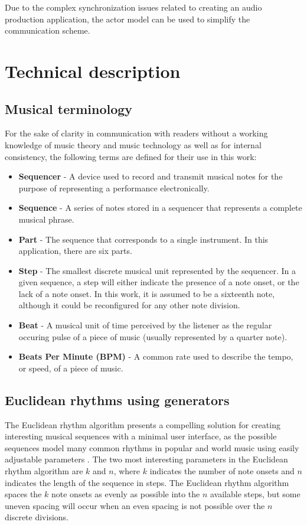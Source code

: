 \documentclass{sig-alternate-05-2015}
\begin{document}
Due to the complex synchronization issues related to creating an audio production application, the actor model can be used to simplify the communication scheme. 

\section{Technical description}

\subsection{Musical terminology}
For the sake of clarity in communication with readers without a working knowledge of music theory and music technology as well as for internal consistency, the following terms are defined for their use in this work:

\begin{itemize}
\item \textbf{Sequencer} - A device used to record and transmit musical notes for the purpose of representing a performance electronically.
\item \textbf{Sequence} - A series of notes stored in a sequencer that represents a complete musical phrase. 
\item \textbf{Part} - The sequence that corresponds to a single instrument. In this application, there are six parts.
\item \textbf{Step} - The smallest discrete musical unit represented by the sequencer. In a given sequence, a step will either indicate the presence of a note onset, or the lack of a note onset. In this work, it is assumed to be a sixteenth note, although it could be reconfigured for any other note division. 
\item \textbf{Beat} - A musical unit of time perceived by the listener as the regular occuring pulse of a piece of music (usually represented by a quarter note).
\item \textbf{Beats Per Minute (BPM)} - A common rate used to describe the tempo, or speed, of a piece of music.
\end{itemize}

\subsection{Euclidean rhythms using generators}
The Euclidean rhythm algorithm presents a compelling solution for creating interesting musical sequences with a minimal user interface, as the possible sequences model many common rhythms in popular and world music using easily adjustable parameters \cite{toussaint2005euclidean}. The two most interesting parameters in the Euclidean rhythm algorithm are $k$ and $n$, where $k$ indicates the number of note onsets and $n$ indicates the length of the sequence in steps. The Euclidean rhythm algorithm spaces the $k$ note onsets as evenly as possible into the $n$ available steps, but some uneven spacing will occur when an even spacing is not possible over the $n$ discrete divisions. 
\end{document}
